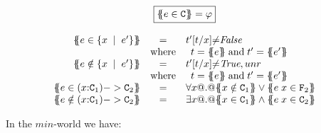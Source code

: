 \documentclass[preprint]{sigplanconf}
\begin{document}
\[\begin{array}{c}
\ruleform{\ctrans{\Sigma}{\Gamma}{e \in \Ct} = \formula{\phi}} \\ \\
\begin{array}{rcl}
\ctrans{\Sigma}{\Gamma}{e \in \{x\;\mid\;e' \}}
  & = & \formula{t'[t/x]{\neq}\False} \\
  & \mbox{where} &
    \begin{array}[t]{l}
      t = \etrans{\Sigma}{\Gamma}{e} \; \text{and} \; t' = \etrans{\Sigma}{\Gamma}{e'}
    \end{array}
\\
\ctrans{\Sigma}{\Gamma}{e \notin \{x\;\mid\;e' \}}
  & = & \formula{t'[t/x]{\neq}\True,\unr} \\
  & \mbox{where} &
    \begin{array}[t]{l}
      t = \etrans{\Sigma}{\Gamma}{e} \; \text{and} \; t' = \etrans{\Sigma}{\Gamma}{e'}
    \end{array}
\\
\ctrans{\Sigma}{\Gamma}{e \in (x{:}\Ct_1) -> \Ct_2}
  & = & \formula{\forall x @.@ \ctrans{\Sigma}{\Gamma,x}{x \notin \Ct_1}
                          \lor \ctrans{\Sigma}{\Gamma,x}{e\;x \in \Ft_2}}
\\
\ctrans{\Sigma}{\Gamma}{e \notin (x{:}\Ct_1) -> \Ct_2}
  & = & \formula{\exists x @.@ \ctrans{\Sigma}{\Gamma,x}{x \in \Ct_1}
                          \land \ctrans{\Sigma}{\Gamma,x}{e\;x \in \Ct_2}}
\end{array}
\end{array}\]

In the $min$-world we have:
\end{document}
